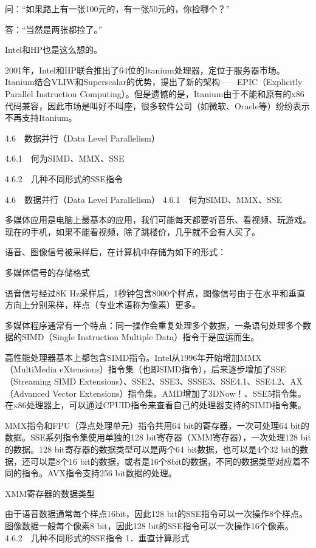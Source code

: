 \documentclass[12pt,UTF8]{ctexbook}
\begin{document}
问：“如果路上有一张100元的，有一张50元的，你捡哪个？”

答：“当然是两张都捡了。”

Intel和HP也是这么想的。

2001年，Intel和HP联合推出了64位的Itanium处理器，定位于服务器市场。Itanium结合VLIW和Superscalar的优势，提出了新的架构——EPIC（Explicitly Parallel Instruction Computing）。但是遗憾的是，Itanium由于不能和原有的x86代码兼容，因此市场是叫好不叫座，很多软件公司（如微软、Oracle等）纷纷表示不再支持Itanium。



4.6　数据并行（Data Level Parallelism）

4.6.1　何为SIMD、MMX、SSE

4.6.2　几种不同形式的SSE指令


4.6　数据并行（Data Level Parallelism）
4.6.1　何为SIMD、MMX、SSE

多媒体应用是电脑上最基本的应用，我们可能每天都要听音乐、看视频、玩游戏。现在的手机，如果不能看视频，除了跳楼价，几乎就不会有人买了。

语音、图像信号被采样后，在计算机中存储为如下的形式：

多媒体信号的存储格式

语音信号经过8K Hz采样后，1秒钟包含8000个样点，图像信号由于在水平和垂直方向上分别采样，样点（专业术语称为像素）更多。

多媒体程序通常有一个特点：同一操作会重复处理多个数据，一条语句处理多个数据的SIMD（Single Instruction Multiple Data）指令于是应运而生。

高性能处理器基本上都包含SIMD指令。Intel从1996年开始增加MMX（MultiMedia eXtensions）指令集（也即SIMD指令），后来逐步增加了SSE（Streaming SIMD Extensions）、SSE2、SSE3、SSSE3、SSE4.1、SSE4.2、AX（Advanced Vector Extensions）指令集。AMD增加了3DNow！、SSE5指令集。在x86处理器上，可以通过CPUID指令来查看自己的处理器支持的SIMD指令集。

MMX指令和FPU（浮点处理单元）指令共用64 bit的寄存器，一次可处理64 bit的数据。SSE系列指令集使用单独的128 bit寄存器（XMM寄存器），一次处理128 bit的数据。128 bit寄存器的数据类型可以是两个64 bit数据，也可以是4个32 bit的数据，还可以是8个16 bit的数据，或者是16个8bit的数据，不同的数据类型对应着不同的指令。AVX指令支持256 bit数据的处理。

XMM寄存器的数据类型

由于语音数据通常每个样点16bit，因此128 bit的SSE指令可以一次操作8个样点。图像数据一般每个像素8 bit，因此128 bit的SSE指令可以一次操作16个像素。
4.6.2　几种不同形式的SSE指令
1．垂直计算形式
\end{document}
